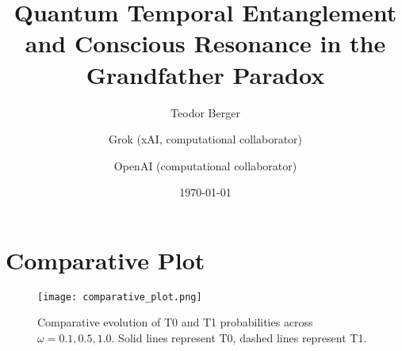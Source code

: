 \section{Comparative Plot}
\begin{figure}[h]
\centering
\texttt{[image: comparative\_plot.png]}
\caption{Comparative evolution of T0 and T1 probabilities across $\omega = 0.1, 0.5, 1.0$. Solid lines represent T0, dashed lines represent T1.}
\label{fig:comparative}
\end{figure}


\documentclass[a4paper,12pt]{article}
\usepackage[utf8]{inputenc}
\usepackage{amsmath, amssymb, amsfonts}
\usepackage{graphicx}
\usepackage{hyperref}
\usepackage{geometry}
\usepackage{natbib}
\geometry{a4paper, margin=1in}

\title{Quantum Temporal Entanglement and Conscious Resonance in the Grandfather Paradox}
\author{Teodor Berger \and Grok (xAI, computational collaborator) \and OpenAI (computational collaborator)}
\date{\today}



\maketitle

\begin{abstract}
The grandfather paradox challenges causality in time travel scenarios. The Mental-Experimental Prototype 1 (MEP1) proposes a resolution through quantum temporal entanglement, modeling conscious intention as a phase $\phi(C) = \pi \sin(\omega t)$ within a 3-qubit quantum circuit. By simulating timeline bifurcation between the original (T0, $|100\rangle$) and alternate (T1, $|011\rangle$) timelines, MEP1 reveals a quantum heating mechanism driven by bioentanglement and vacuum fluctuations. Our findings suggest that conscious control modulates probabilistic outcomes, offering insights into quantum gravity, temporal mechanics, and the ontology of choice.
\end{abstract}

\section{Introduction}
The grandfather paradox questions the consistency of causality in time travel. MEP1 leverages quantum mechanics to model conscious intention as a quantum phase, exploring a meta-temporal dimension ($T^*$) that mediates timeline divergence. Inspired by EEG studies linking neural coherence to quantum processes \citep{lutz2004}, MEP1 simulates a 3-qubit circuit to investigate probabilistic resolutions of temporal paradoxes.

